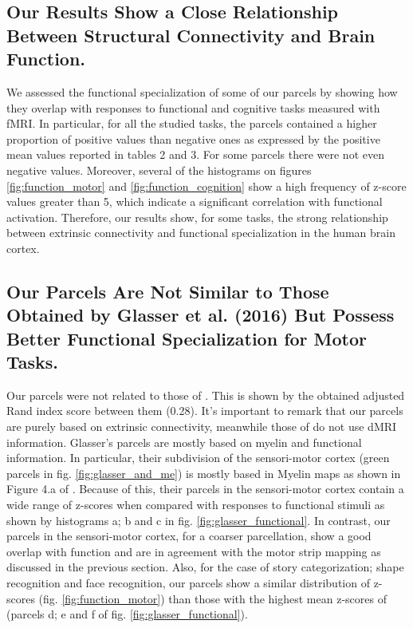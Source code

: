 \subsection{Our Results Show a Close Relationship Between Structural Connectivity
and Brain Function.}
%
We assessed the functional specialization of some of our parcels by showing
how they overlap with responses to functional and cognitive tasks measured
with fMRI. In particular, for all the studied tasks, the parcels contained
a higher proportion of positive values than negative ones as expressed by the
positive mean values reported in tables 2 and 3. For some parcels there
were not even negative values. Moreover, several of the histograms on figures
\ref{fig:function_motor} and \ref{fig:function_cognition} show a high frequency
of z-score values greater than 5, which indicate a significant correlation with
functional activation. Therefore, our results show, for some tasks, the
strong relationship between extrinsic connectivity and functional
specialization in the human brain cortex. 
%
\subsection{Our Parcels Are Not Similar to Those Obtained by Glasser et al. (2016) But 
			Possess Better Functional Specialization for Motor Tasks.}
Our parcels were not related to those of \citet{Glasser2016}. This is shown by the
obtained adjusted Rand index score between them (0.28). It's important to remark that
our parcels are purely based on extrinsic connectivity, meanwhile those of \citet{Glasser2016}
do not use dMRI information. Glasser's parcels are mostly based on myelin and functional information.
In particular, their subdivision of the sensori-motor cortex (green parcels in fig.
\ref{fig:glasser_and_me}) is mostly based in Myelin maps as shown in Figure 4.a of 
\citet{Glasser2016}. Because of this, their parcels in the sensori-motor cortex contain 
a wide range of z-scores when compared with responses to functional stimuli as shown by
histograms a; b and c in fig.
\ref{fig:glasser_functional}. In contrast, our parcels in the sensori-motor cortex,
for a coarser parcellation, show a good overlap with function and are in agreement with
the motor strip mapping as discussed in the previous section. Also, for the case of story
categorization; shape recognition and face recognition, our parcels show a similar
distribution of z-scores (fig. \ref{fig:function_motor}) than those with the highest 
mean z-scores of \citet{Glasser2016} (parcels d; e and f of  fig. \ref{fig:glasser_functional}).
%
